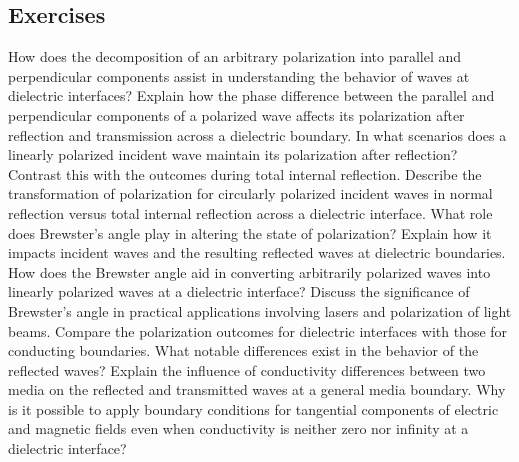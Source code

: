 \begin{mdframed}[ backgroundcolor=lightblue, linewidth=1pt, hidealllines=true]
\section{Exercises}
\begin{ExerciseList}
    \Exercise[label={ex11}]
    How does the decomposition of an arbitrary polarization into parallel and perpendicular components assist in understanding the behavior of waves at dielectric interfaces?
    \Exercise[label={ex11}]
    Explain how the phase difference between the parallel and perpendicular components of a polarized wave affects its polarization after reflection and transmission across a dielectric boundary.
    \Exercise[label={ex11}]
    In what scenarios does a linearly polarized incident wave maintain its polarization after reflection? Contrast this with the outcomes during total internal reflection.
    \Exercise[label={ex11}]
    Describe the transformation of polarization for circularly polarized incident waves in normal reflection versus total internal reflection across a dielectric interface.
    \Exercise[label={ex11}]
    What role does Brewster's angle play in altering the state of polarization? Explain how it impacts incident waves and the resulting reflected waves at dielectric boundaries.
    \Exercise[label={ex11}]
    How does the Brewster angle aid in converting arbitrarily polarized waves into linearly polarized waves at a dielectric interface?
    \Exercise[label={ex11}]
    Discuss the significance of Brewster's angle in practical applications involving lasers and polarization of light beams.
    \Exercise[label={ex11}]
    Compare the polarization outcomes for dielectric interfaces with those for conducting boundaries. What notable differences exist in the behavior of the reflected waves?
    \Exercise[label={ex11}]
    Explain the influence of conductivity differences between two media on the reflected and transmitted waves at a general media boundary.
    \Exercise[label={ex11}]
    Why is it possible to apply boundary conditions for tangential components of electric and magnetic fields even when conductivity is neither zero nor infinity at a dielectric interface?
\end{ExerciseList}
\end{mdframed}